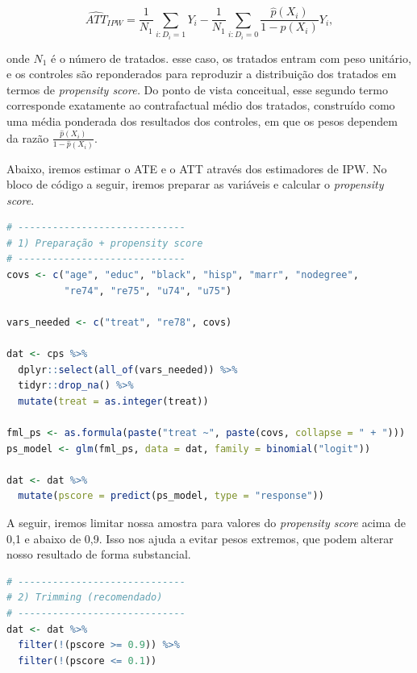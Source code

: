 $$
\widehat{ATT}_{IPW} = \frac{1}{N_1} \sum_{i : D_i = 1} Y_i - \frac{1}{N_1} \sum_{i : D_i = 0} \frac{\hat{p}(X_i)}{1-\hat{p}(X_i)}Y_i,
$$

\noindent onde $N_1$ é o número de tratados. esse caso, os tratados entram com peso unitário, e os controles são reponderados para reproduzir a distribuição dos tratados em termos de \textit{propensity score.
}
Do ponto de vista conceitual, esse segundo termo corresponde exatamente ao contrafactual médio dos tratados, construído como uma média ponderada dos resultados dos controles, em que os pesos dependem da razão $\frac{\hat{p}(X_i)}{1-\hat{p}(X_i)}$.

Abaixo, iremos estimar o ATE e o ATT através dos estimadores de IPW. No bloco de código a seguir, iremos preparar as variáveis e calcular o \textit{propensity score}.

\begin{boxH}
\begin{lstlisting}[language = R]
# -----------------------------
# 1) Preparação + propensity score
# -----------------------------
covs <- c("age", "educ", "black", "hisp", "marr", "nodegree",
          "re74", "re75", "u74", "u75")

vars_needed <- c("treat", "re78", covs)

dat <- cps %>%
  dplyr::select(all_of(vars_needed)) %>%
  tidyr::drop_na() %>%
  mutate(treat = as.integer(treat))

fml_ps <- as.formula(paste("treat ~", paste(covs, collapse = " + ")))
ps_model <- glm(fml_ps, data = dat, family = binomial("logit"))

dat <- dat %>%
  mutate(pscore = predict(ps_model, type = "response"))

\end{lstlisting}
\end{boxH}

A seguir, iremos limitar nossa amostra para valores do \textit{propensity score} acima de 0,1 e abaixo de 0,9. Isso nos ajuda a evitar pesos extremos, que podem alterar nosso resultado de forma substancial.

\begin{boxH}
\begin{lstlisting}[language = R]
# -----------------------------
# 2) Trimming (recomendado)
# -----------------------------
dat <- dat %>%
  filter(!(pscore >= 0.9)) %>% 
  filter(!(pscore <= 0.1))

\end{lstlisting}
\end{boxH}

